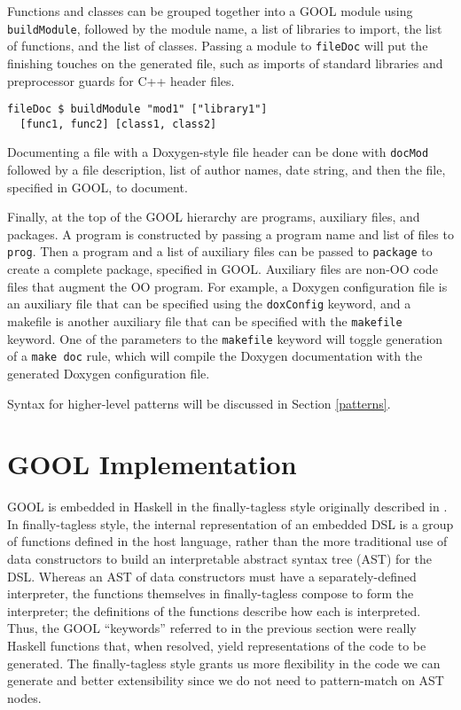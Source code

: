 \documentclass[sigplan,review,anonymous]{acmart}
\begin{document}
Functions and classes can be grouped together into a GOOL module using 
\verb|buildModule|, followed by the module name, a list of libraries to import, 
the list of functions, and the list of classes. Passing a module to 
\verb|fileDoc| will put the finishing touches on the generated file, such as 
imports of standard libraries and preprocessor guards for C++ header files.
\begin{lstlisting}
fileDoc $ buildModule "mod1" ["library1"] 
  [func1, func2] [class1, class2] 
\end{lstlisting}
Documenting a file with a Doxygen-style file header can be done with 
\verb|docMod| followed by a file description, list of author names, date 
string, and then the file, specified in GOOL,  to document.

Finally, at the top of the GOOL hierarchy are programs, auxiliary files, and 
packages. A program is constructed by passing a program name and list of files 
to \verb|prog|. Then a program and a list of auxiliary files can be passed to 
\verb|package| to create a complete package, specified in GOOL. Auxiliary files 
are non-OO code files that augment the OO program. For example, a Doxygen 
configuration file is an auxiliary file that can be specified using the 
\verb|doxConfig| keyword, and a makefile is another auxiliary file that can be 
specified with the \verb|makefile| keyword. One of the parameters to the 
\verb|makefile| keyword will toggle generation of a \verb|make doc| rule, which 
will compile the Doxygen documentation with the generated Doxygen configuration 
file.

Syntax for higher-level patterns will be discussed in Section \ref{patterns}.

\section{GOOL Implementation} \label{implementation}

GOOL is embedded in Haskell in the finally-tagless style originally described 
in \cite{carette2009finally}. In finally-tagless style, the internal 
representation of an embedded DSL is a group of functions defined in the host 
language, rather than the more traditional use of data constructors to build an 
interpretable abstract syntax tree (AST) for the DSL. Whereas an AST of data 
constructors must have a separately-defined interpreter, the functions 
themselves in finally-tagless compose to form the interpreter; the definitions 
of the functions describe how each is interpreted. Thus, the GOOL ``keywords'' 
referred to in the previous section were really Haskell functions that, when 
resolved, yield representations of the code to be generated. The 
finally-tagless style grants us more flexibility in the code we can generate 
and better extensibility since we do not need to pattern-match on AST nodes.
\end{document}

